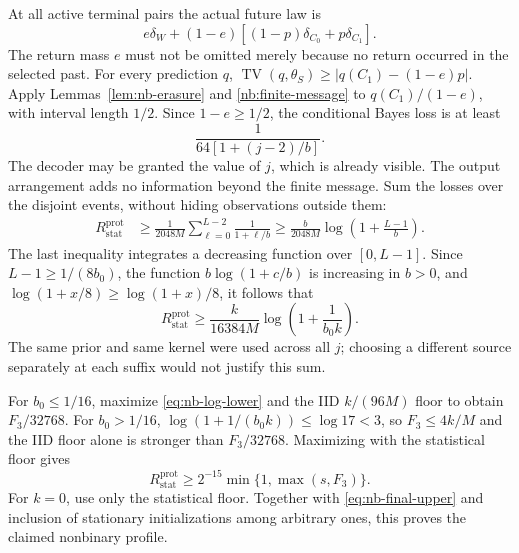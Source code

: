 At all active terminal pairs the actual future law is
\begin{equation}\label{eq:nb-true-future}
 e\delta_W+(1-e)[(1-p)\delta_{C_0}+p\delta_{C_1}].
\end{equation}
The return mass $e$ must not be omitted merely because no return
occurred in the selected past.  For every prediction $q$,
$\operatorname{TV}(q,\theta_S)\geq|q(C_1)-(1-e)p|$.
Apply Lemmas~\ref{lem:nb-erasure} and \ref{nb:finite-message} to
$q(C_1)/(1-e)$, with interval length $1/2$.  Since $1-e\geq1/2$,
the conditional Bayes loss is at least
\[
 \frac1{64[1+(j-2)/b]}.
\]
The decoder may be granted the value of $j$, which is already visible.
The output arrangement adds no information beyond the finite message.
Sum the losses over the disjoint events, without hiding observations
outside them:
\begin{align}\label{eq:nb-harmonic-lower}
 R_{\mathrm{stat}}^{\mathrm{prot}}
 &\geq\frac1{2048M}\sum_{\ell=0}^{L-2}\frac1{1+\ell/b}
 \geq\frac b{2048M}\log\left(1+\frac{L-1}{b}\right).
\end{align}
The last inequality integrates a decreasing function over $[0,L-1]$.
Since $L-1\geq1/(8b_0)$, the function
$b\log(1+c/b)$ is increasing in $b>0$, and
$\log(1+x/8)\geq\log(1+x)/8$, it follows that
\begin{equation}\label{eq:nb-log-lower}
 R_{\mathrm{stat}}^{\mathrm{prot}}
 \geq\frac{k}{16384M}\log\left(1+\frac1{b_0k}\right).
\end{equation}
The same prior and same kernel were used across all $j$; choosing a
different source separately at each suffix would not justify this sum.

For $b_0\leq1/16$, maximize \eqref{eq:nb-log-lower} and the IID
$k/(96M)$ floor to obtain $F_3/32768$.  For $b_0>1/16$,
$\log(1+1/(b_0k))\leq\log17<3$, so $F_3\leq4k/M$ and the IID floor
alone is stronger than $F_3/32768$.  Maximizing with the statistical
floor gives
\begin{equation}\label{eq:nb-final-lower}
 R_{\mathrm{stat}}^{\mathrm{prot}}
 \geq2^{-15}\min\{1,\max(s,F_3)\}.
\end{equation}
For $k=0$, use only the statistical floor.  Together with
\eqref{eq:nb-final-upper} and inclusion of stationary initializations
among arbitrary ones, this proves the claimed nonbinary profile.

